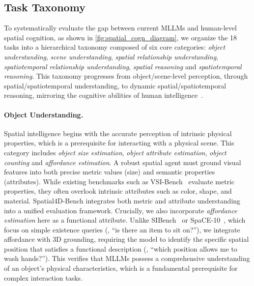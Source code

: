 \subsection{Task Taxonomy}
\label{subsec:taxonomy}

To systematically evaluate the gap between current MLLMs and human-level spatial cognition, as shown in \cref{fig:spatial_cogn_diagram}, we organize the 18 tasks into a hierarchical taxonomy composed of six core categories: \textit{object understanding}, \textit{scene understanding}, \textit{spatial relationship understanding}, \textit{spatiotemporal relationship understanding}, \textit{spatial reasoning} and \textit{spatiotemporal reasoning}. This taxonomy progresses from object/scene-level perception, through spatial/spatiotemporal understanding, to dynamic spatial/spatiotemporal reasoning, mirroring the cognitive abilities of human intelligence~\cite{waller2013handbook, newcombe2004spatial}.


\paragraph{Object Understanding.} Spatial intelligence begins with the accurate perception of intrinsic physical properties, which is a prerequisite for interacting with a physical scene.
This category includes \textit{object size estimation}, \textit{object attribute estimation},  \textit{object counting} and \textit{affordance estimation}. 
A robust spatial agent must ground visual features into both precise metric values (size) and semantic properties (attributes).
While existing benchmarks such as VSI-Bench~\cite{Yang_2025_CVPR} evaluate metric properties, they often overlook intrinsic attributes such as color, shape, and material.
Spatial4D-Bench integrates both metric and attribute understanding into a unified evaluation framework.
Crucially, we also incorporate \textit{affordance estimation} here as a functional attribute. 
Unlike SIBench~\cite{yu2025far} or SpaCE-10~\cite{gong2025space}, which focus on simple existence queries (\eg, ``is there an item to sit on?''), we integrate affordance with 3D grounding, requiring the model to identify the specific spatial position that satisfies a functional description (\eg, ``which position allows me to wash hands?''). 
This verifies that MLLMs possess a comprehensive understanding of an object's physical characteristics, which is a fundamental prerequisite for complex interaction tasks.


